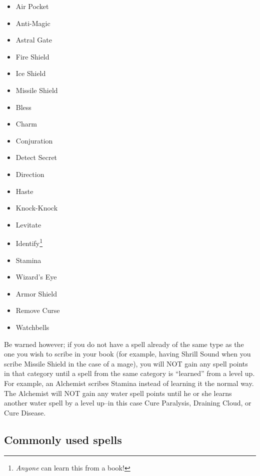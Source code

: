 \documentclass[12pt]{article}
\providecommand{\tightlist}{%
  \setlength{\itemsep}{0pt}\setlength{\parskip}{0pt}}
\begin{document}
\begin{multicols}{2}
\begin{itemize}
\tightlist
\item
  Air Pocket
\item
  Anti-Magic
\item
  Astral Gate
\item
  Fire Shield
\item
  Ice Shield
\item
  Missile Shield
\item
  Bless
\item
  Charm
\item
  Conjuration
\item
  Detect Secret
\item
  Direction
\item
  Haste
\item
  Knock-Knock
\item
  Levitate
\item
  Identify\protect\footnote{\emph{Anyone} can learn this from a book!}
\item
  Stamina
\item
  Wizard's Eye
\item
  Armor Shield
\item
  Remove Curse
\item
  Watchbells
\end{itemize}
\end{multicols}

Be warned however; if you do not have a spell already of the same type
as the one you wish to scribe in your book (for example, having Shrill
Sound when you scribe Missile Shield in the case of a mage), you will
NOT gain any spell points in that category until a spell from the same
category is ``learned'' from a level up. For example, an Alchemist
scribes Stamina instead of learning it the normal way. The Alchemist
will NOT gain any water spell points until he or she learns another
water spell by a level up--in this case Cure Paralysis, Draining Cloud,
or Cure Disease.

\subsection{Commonly used spells}\label{commonly-used-spells}
\end{document}
